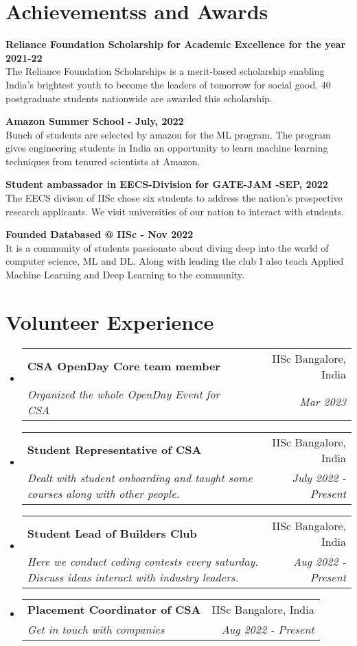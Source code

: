 \documentclass[a4paper,20pt]{article}
\makeatletter
\newcommand{\resumeSubheading}[4]{
	\vspace{-1pt}\item
	\begin{tabular*}{0.97\textwidth}{l@{\extracolsep{\fill}}r}
		\textbf{#1} & #2 \\
		\textit{#3} & \textit{#4} \\
	\end{tabular*}\vspace{-5pt}
}
\newcommand{\resumeSubHeadingListStart}{\begin{itemize}[leftmargin=*]}
\newcommand{\resumeSubHeadingListEnd}{\end{itemize}}
\makeatother
\begin{document}
	\section{Achievementss and Awards}
	\begin{description}[font=$\bullet$]
		\item \textbf{Reliance Foundation Scholarship for Academic Excellence for the year 2021-22 }\\
		The Reliance Foundation Scholarships is a merit-based scholarship enabling India's brightest youth to become the leaders of tomorrow for social good. 40 postgraduate students nationwide are awarded this scholarship.
		\vspace{-5pt}
		\item \textbf{Amazon Summer School - July, 2022 }\\
		Bunch of students are selected by amazon for the ML program. The program gives engineering students in India an opportunity to learn machine learning techniques from tenured scientists at Amazon.  
		\vspace{-5pt}
		\item \textbf{Student ambassador in EECS-Division for GATE-JAM -SEP, 2022 }\\
		The EECS divison of IISc chose six students to address the nation's prospective research applicants. We visit universities of our nation to interact with students.
		\vspace{-5pt}
		\item \textbf{Founded Databased @ IISc - Nov 2022}\\
		It is a community of students passionate about diving deep into the world of computer science, ML and DL. Along with leading the club I also teach Applied Machine Learning and Deep Learning to the community.
		\vspace{-5pt}

		
	\end{description}
	
	\vspace{-5pt}
	\section{Volunteer Experience}
	\resumeSubHeadingListStart
	\resumeSubheading
	{CSA OpenDay Core team member}{IISc Bangalore, India}
	{Organized the whole OpenDay Event for CSA }{Mar 2023}
	\vspace{5pt}
	\resumeSubheading
	{Student Representative of CSA}{IISc Bangalore, India}
	{Dealt with student onboarding and taught some courses along with other people. }{July 2022 - Present}
	\vspace{5pt}
	\resumeSubheading
	{Student Lead of Builders Club}{IISc Bangalore, India}
	{Here we conduct coding contests every saturday. Discuss ideas interact with industry leaders.}{Aug 2022 - Present}
	\resumeSubheading
	{Placement Coordinator of CSA}{IISc Bangalore, India}
	{Get in touch with companies}{Aug 2022 - Present}
	
	
	\resumeSubHeadingListEnd
	
\end{document}
